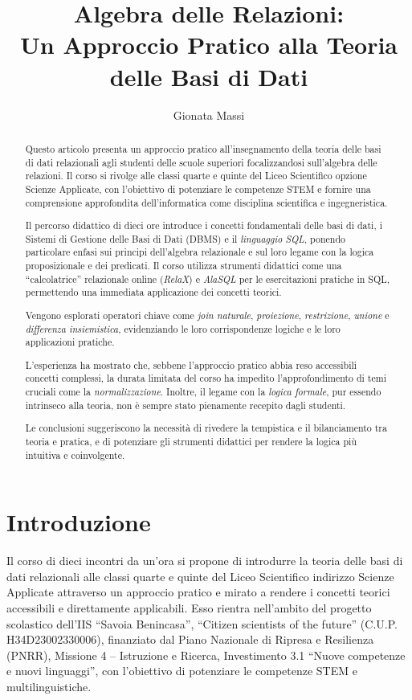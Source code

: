 \documentclass[withtimes]{easychair}
\title{Algebra delle Relazioni:\\Un Approccio Pratico alla Teoria delle
Basi di Dati}
\author{
Gionata Massi%
}
\institute{
   Istituto di Istruzione Superiore Savoia Benincasa\\
   Ancona, Italia\\
   \email{gionata.massi@savoiabenincasa.it}
}
\begin{document}
\maketitle


\begin{abstract}
Questo articolo presenta un approccio pratico all'insegnamento della teoria delle basi di dati relazionali agli studenti delle scuole superiori focalizzandosi sull'algebra delle relazioni. Il corso si rivolge alle classi quarte e quinte del Liceo Scientifico opzione Scienze Applicate, con l'obiettivo di potenziare le competenze STEM e fornire una comprensione approfondita dell'informatica come disciplina scientifica e ingegneristica.

Il percorso didattico di dieci ore introduce i concetti fondamentali delle basi di dati, i Sistemi di Gestione delle Basi di Dati (DBMS) e il \emph{linguaggio SQL}, ponendo particolare enfasi sui principi dell'algebra relazionale e sul loro legame con la logica proposizionale e dei predicati. Il corso utilizza strumenti didattici come una ``calcolatrice'' relazionale online (\emph{RelaX}) e \emph{AlaSQL} per le esercitazioni pratiche in SQL, permettendo una immediata applicazione dei concetti teorici.

Vengono esplorati operatori chiave come \emph{join naturale}, \emph{proiezione}, \emph{restrizione}, \emph{unione} e \emph{differenza insiemistica}, evidenziando le loro corrispondenze logiche e le loro applicazioni pratiche.

L'esperienza ha mostrato che, sebbene l'approccio pratico abbia reso accessibili concetti complessi, la durata  limitata del corso ha impedito l'approfondimento di temi cruciali come la \emph{normalizzazione}. Inoltre, il legame con la \emph{logica formale}, pur essendo intrinseco alla teoria, non è sempre stato pienamente recepito dagli studenti.

Le conclusioni suggeriscono la necessità di rivedere la tempistica e il bilanciamento tra teoria e pratica, e di potenziare gli strumenti didattici per rendere la logica più intuitiva e coinvolgente.
\end{abstract}

\section{Introduzione}\label{introduzione}

Il corso di dieci incontri da un'ora si propone di introdurre la teoria delle basi di dati relazionali alle classi quarte e quinte del Liceo Scientifico indirizzo Scienze Applicate attraverso un approccio pratico e mirato a rendere i concetti teorici accessibili e direttamente applicabili. Esso rientra nell'ambito del progetto scolastico dell'IIS ``Savoia Benincasa'', ``Citizen scientists of the future'' (C.U.P. H34D23002330006), finanziato dal Piano Nazionale di Ripresa e Resilienza (PNRR), Missione 4 -- Istruzione e Ricerca, Investimento 3.1 ``Nuove competenze e nuovi linguaggi'', con l'obiettivo di potenziare le competenze STEM e multilinguistiche.
\end{document}
